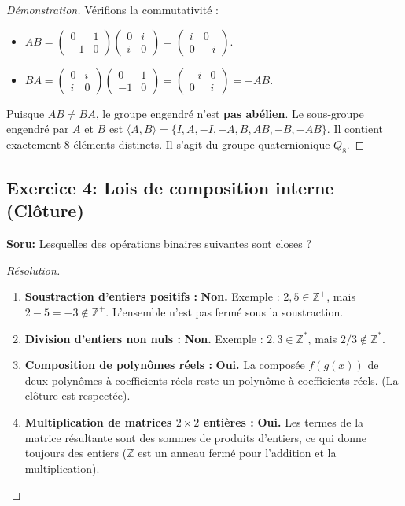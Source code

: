 \documentclass[12pt,a4paper]{report}
\begin{document}
\begin{proof}[Démonstration]
Vérifions la commutativité :
\begin{itemize}
    \item $AB = \begin{pmatrix} 0 & 1 \\ -1 & 0 \end{pmatrix} \begin{pmatrix} 0 & i \\ i & 0 \end{pmatrix} = \begin{pmatrix} i & 0 \\ 0 & -i \end{pmatrix}$.
    \item $BA = \begin{pmatrix} 0 & i \\ i & 0 \end{pmatrix} \begin{pmatrix} 0 & 1 \\ -1 & 0 \end{pmatrix} = \begin{pmatrix} -i & 0 \\ 0 & i \end{pmatrix} = -AB$.
\end{itemize}
Puisque $AB \neq BA$, le groupe engendré n'est \textbf{pas abélien}.
Le sous-groupe engendré par $A$ et $B$ est $\langle A, B \rangle = \{ I, A, -I, -A, B, AB, -B, -AB \}$. Il contient exactement 8 éléments distincts. Il s'agit du groupe quaternionique $Q_8$.
\end{proof}

\subsection*{Exercice 4: Lois de composition interne (Clôture)}
\textbf{Soru:} Lesquelles des opérations binaires suivantes sont closes ?
\begin{proof}[Résolution]
\begin{enumerate}
    \item[(a)] \textbf{Soustraction d'entiers positifs :} \textbf{Non.} Exemple : $2, 5 \in \mathbb{Z}^+$, mais $2 - 5 = -3 \notin \mathbb{Z}^+$. L'ensemble n'est pas fermé sous la soustraction.
    \item[(b)] \textbf{Division d'entiers non nuls :} \textbf{Non.} Exemple : $2, 3 \in \mathbb{Z}^*$, mais $2 / 3 \notin \mathbb{Z}^*$.
    \item[(c)] \textbf{Composition de polynômes réels :} \textbf{Oui.} La composée $f(g(x))$ de deux polynômes à coefficients réels reste un polynôme à coefficients réels. (La clôture est respectée).
    \item[(d)] \textbf{Multiplication de matrices $2 \times 2$ entières :} \textbf{Oui.} Les termes de la matrice résultante sont des sommes de produits d'entiers, ce qui donne toujours des entiers ($\mathbb{Z}$ est un anneau fermé pour l'addition et la multiplication).
\end{enumerate}
\end{proof}
\end{document}
